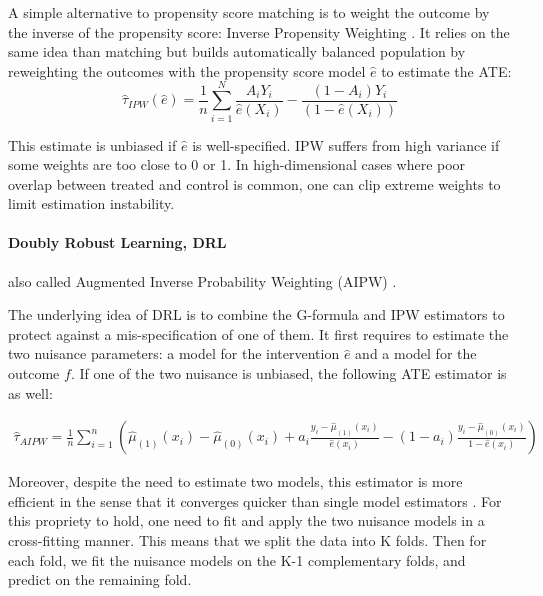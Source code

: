 \documentclass[french,12pt,twoside,a4paper]{book}
\begin{document}
\begin{appendices}
\begin{background_box_left}
    A simple alternative to propensity score matching is to weight the outcome by
    the inverse of the propensity score: Inverse Propensity Weighting
    \citep{austin2015moving}. It relies on the same idea than matching but builds
    automatically balanced population by reweighting the outcomes with the
    propensity score model $\hat{e}$ to estimate the ATE:
    \begin{equation}
      \hat \tau_{IPW}(\hat e) = \frac{1}{n} \sum_{i=1}^N \frac{A_i Y_i}{\hat e(X_i)} - \frac{(1-A_i)Y_i}{(1-\hat e(X_i))}
    \end{equation}

    This estimate is unbiased if $\hat e$ is well-specified. IPW suffers from high
    variance if some weights are too close to 0 or 1. In high-dimensional cases
    where poor overlap between treated and control is common, one can clip extreme
    weights to limit estimation instability.


    \paragraph{Doubly Robust Learning, DRL} also called Augmented Inverse
    Probability Weighting (AIPW) \citep{robins1994estimation}.

    The underlying idea of DRL is to combine the G-formula and IPW estimators to
    protect against a mis-specification of one of them. It first requires to
    estimate the two nuisance parameters: a model for the intervention $\hat{e}$
    and a model for the outcome $f$. If one of the two nuisance is unbiased, the
    following ATE estimator is as well:

    $$\begin{aligned} \widehat{\tau}_{A I P W}=\frac{1}{n}
        \sum_{i=1}^{n}\left(\hat \mu_{(1)}\left(x_{i}\right)-\hat \mu_{(0)}\left(x_{i}\right)+a_{i}
        \frac{y_{i}-\hat \mu_{(1)}\left(x_{i}\right)}{\hat{e}\left(x_{i}\right)}-\left(1-a_{i}\right)
        \frac{y_{i}-\hat \mu_{(0)}\left(x_{i}\right)}{1-\hat{e}\left(x_{i}\right)}\right)
      \end{aligned}$$

    Moreover, despite the need to estimate two models, this estimator is more
    efficient in the sense that it converges quicker than single model estimators
    \citep{wager2020stats}. For this propriety to hold, one need to fit and apply
    the two nuisance models in a cross-fitting manner. This means that we split
    the data into K folds. Then for each fold, we fit the nuisance models on the
    K-1 complementary folds, and predict on the remaining fold.


\end{background_box_left}
\end{appendices}
\end{document}
